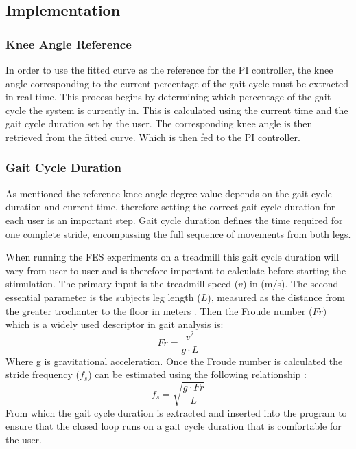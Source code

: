 \subsection{Implementation}
\subsubsection{Knee Angle Reference}
In order to use the fitted curve as the reference for the PI controller, the knee angle corresponding to the current percentage of the gait cycle must be extracted in real time. This process begins by determining which percentage of the gait cycle the system is currently in. This is calculated using the current time and the gait cycle duration set by the user. The corresponding knee angle is then retrieved from the fitted curve. Which is then fed to the PI controller.

\subsubsection{Gait Cycle Duration}
As mentioned the reference knee angle degree value depends on the gait cycle duration and current time, therefore setting the correct gait cycle duration for each user is an important step. Gait cycle duration defines the time required for one complete stride, encompassing the full sequence of movements from both legs. 

When running the FES experiments on a treadmill this gait cycle duration will vary from user to user and is therefore important to calculate before starting the stimulation. The primary input is the treadmill speed (\(v\)) in (m/s). The second essential parameter is the subjects leg length (\(L\)), measured as the distance from the greater trochanter to the floor in meters \cite{meinders_how_2021}. Then the Froude number (\(Fr)\) which is a widely used descriptor in gait analysis is:
\begin{equation}
    Fr = \frac{v^2}{g \cdot L}
\end{equation}
Where g is gravitational acceleration. Once the Froude number is calculated the stride frequency (\(f_s\)) can be estimated using the following relationship \cite{meinders_how_2021}:
\begin{equation}
    f_s = \sqrt{\frac{g \cdot Fr}{L}}
\end{equation}
From which the gait cycle duration is extracted and inserted into the program to ensure that the closed loop runs on a gait cycle duration that is comfortable for the user.

